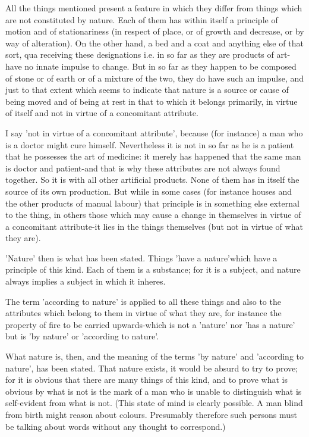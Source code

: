 All the things mentioned present a feature in which they differ from
things which are not constituted by nature. Each of them has within
itself a principle of motion and of stationariness (in respect of
place, or of growth and decrease, or by way of alteration). On the
other hand, a bed and a coat and anything else of that sort, qua receiving
these designations i.e. in so far as they are products of art-have
no innate impulse to change. But in so far as they happen to be composed
of stone or of earth or of a mixture of the two, they do have such
an impulse, and just to that extent which seems to indicate that nature
is a source or cause of being moved and of being at rest in that to
which it belongs primarily, in virtue of itself and not in virtue
of a concomitant attribute. 

I say 'not in virtue of a concomitant attribute', because (for instance)
a man who is a doctor might cure himself. Nevertheless it is not in
so far as he is a patient that he possesses the art of medicine: it
merely has happened that the same man is doctor and patient-and that
is why these attributes are not always found together. So it is with
all other artificial products. None of them has in itself the source
of its own production. But while in some cases (for instance houses
and the other products of manual labour) that principle is in something
else external to the thing, in others those which may cause a change
in themselves in virtue of a concomitant attribute-it lies in the
things themselves (but not in virtue of what they are). 

'Nature' then is what has been stated. Things 'have a nature'which
have a principle of this kind. Each of them is a substance; for it
is a subject, and nature always implies a subject in which it inheres.

The term 'according to nature' is applied to all these things and
also to the attributes which belong to them in virtue of what they
are, for instance the property of fire to be carried upwards-which
is not a 'nature' nor 'has a nature' but is 'by nature' or 'according
to nature'. 

What nature is, then, and the meaning of the terms 'by nature' and
'according to nature', has been stated. That nature exists, it would
be absurd to try to prove; for it is obvious that there are many things
of this kind, and to prove what is obvious by what is not is the mark
of a man who is unable to distinguish what is self-evident from what
is not. (This state of mind is clearly possible. A man blind from
birth might reason about colours. Presumably therefore such persons
must be talking about words without any thought to correspond.)

